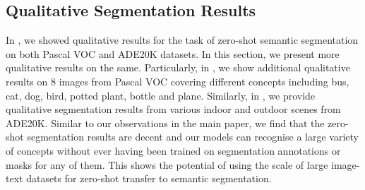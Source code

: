 \documentclass[10pt,twocolumn,letterpaper]{article}
\begin{document}
\subsection {Qualitative Segmentation Results}
\label{app:qualitative_segmentation_results}

In , we showed qualitative results for the task of zero-shot semantic segmentation on both Pascal VOC and ADE20K datasets. In this section, we present more qualitative results on the same. Particularly, in , we show additional qualitative results on 8 images from Pascal VOC covering different concepts including bus, cat, dog, bird, potted plant, bottle and plane. Similarly, in , we provide qualitative segmentation results from various indoor and outdoor scenes from ADE20K. Similar to our observations in the main paper, we find that the zero-shot segmentation results are decent and our models can recognise a large variety of concepts without ever having been trained on segmentation annotations or masks for any of them. This shows the potential of using the scale of large image-text datasets for zero-shot transfer to semantic segmentation. 
\end{document}
